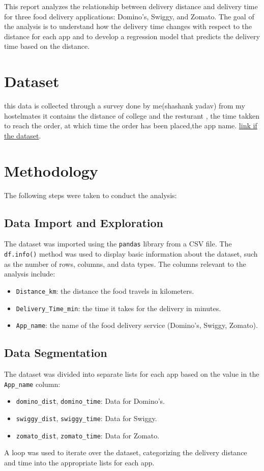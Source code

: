 \documentclass[12pt]{article}
\begin{document}
This report analyzes the relationship between delivery distance and delivery time for three food delivery applications: Domino's, Swiggy, and Zomato. The goal of the analysis is to understand how the delivery time changes with respect to the distance for each app and to develop a regression model that predicts the delivery time based on the distance.

\section*{Dataset}
this data is collected through a survey done by me(shashank yadav) from my hostelmates it contains the distance of college and the resturant , the time takken to reach the order, at which time the order has been placed,the app name.
\href{https://drive.google.com/file/d/1cztFtHKCk420QXCxwn9kOzHQL-xQaZKM/view?usp=sharing}{link if the dataset}.

\section*{Methodology}

The following steps were taken to conduct the analysis:

\subsection{Data Import and Exploration}
The dataset was imported using the \texttt{pandas} library from a CSV file. The \texttt{df.info()} method was used to display basic information about the dataset, such as the number of rows, columns, and data types. The columns relevant to the analysis include:
\begin{itemize}
    \item \texttt{Distance\_km}: the distance the food travels in kilometers.
    \item \texttt{Delivery\_Time\_min}: the time it takes for the delivery in minutes.
    \item \texttt{App\_name}: the name of the food delivery service (Domino's, Swiggy, Zomato).
\end{itemize}

\subsection*{Data Segmentation}
The dataset was divided into separate lists for each app based on the value in the \texttt{App\_name} column:
\begin{itemize}
    \item \texttt{domino\_dist}, \texttt{domino\_time}: Data for Domino’s.
    \item \texttt{swiggy\_dist}, \texttt{swiggy\_time}: Data for Swiggy.
    \item \texttt{zomato\_dist}, \texttt{zomato\_time}: Data for Zomato.
\end{itemize}
A loop was used to iterate over the dataset, categorizing the delivery distance and time into the appropriate lists for each app.
\end{document}
